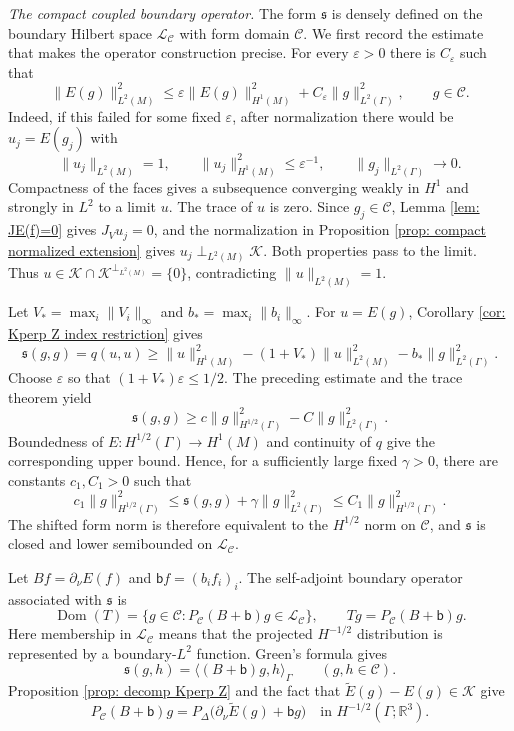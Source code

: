 \documentclass[11pt,twoside]{amsart}
\numberwithin{equation}{section}
\begin{document}
\medskip
\noindent\emph{The compact coupled boundary operator.}
The form $\mathfrak s$ is densely defined on the boundary Hilbert space $\mathscr L_\mathcal C$ with form domain $\mathcal C$. We first record the estimate that makes the operator construction precise. For every $\varepsilon>0$ there is $C_\varepsilon$ such that
\[
\|E(g)\|_{L^2(M)}^2
\le
\varepsilon\|E(g)\|_{H^1(M)}^2
+C_\varepsilon\|g\|_{L^2(\Gamma)}^2,
\qquad g\in\mathcal C.
\]
Indeed, if this failed for some fixed $\varepsilon$, after normalization there would be $u_j=E(g_j)$ with
\[
\|u_j\|_{L^2(M)}=1,
\qquad
\|u_j\|_{H^1(M)}^2\le\varepsilon^{-1},
\qquad
\|g_j\|_{L^2(\Gamma)}\to0.
\]
Compactness of the faces gives a subsequence converging weakly in $H^1$ and strongly in $L^2$ to a limit $u$. The trace of $u$ is zero. Since $g_j\in\mathcal C$, Lemma \ref{lem: JE(f)=0} gives $J_Vu_j=0$, and the normalization in Proposition \ref{prop: compact normalized extension} gives $u_j\perp_{L^2(M)}\mathcal K$. Both properties pass to the limit. Thus $u\in\mathcal K\cap\mathcal K^{\perp_{L^2(M)}}=\{0\}$, contradicting $\|u\|_{L^2(M)}=1$.

Let $V_*=\max_i\|V_i\|_\infty$ and $b_*=\max_i\|b_i\|_\infty$. For $u=E(g)$, Corollary \ref{cor: Kperp Z index restriction} gives
\[
\mathfrak s(g,g)=q(u,u)
\ge
\|u\|_{H^1(M)}^2
-(1+V_*)\|u\|_{L^2(M)}^2
-b_*\|g\|_{L^2(\Gamma)}^2.
\]
Choose $\varepsilon$ so that $(1+V_*)\varepsilon\le1/2$. The preceding estimate and the trace theorem yield
\[
\mathfrak s(g,g)
\ge
c\|g\|_{H^{1/2}(\Gamma)}^2
-C\|g\|_{L^2(\Gamma)}^2.
\]
Boundedness of $E:H^{1/2}(\Gamma)\to H^1(M)$ and continuity of $q$ give the corresponding upper bound. Hence, for a sufficiently large fixed $\gamma>0$, there are constants $c_1,C_1>0$ such that
\[
c_1\|g\|_{H^{1/2}(\Gamma)}^2
\le
\mathfrak s(g,g)+\gamma\|g\|_{L^2(\Gamma)}^2
\le
C_1\|g\|_{H^{1/2}(\Gamma)}^2.
\]
The shifted form norm is therefore equivalent to the $H^{1/2}$ norm on $\mathcal C$, and $\mathfrak s$ is closed and lower semibounded on $\mathscr L_\mathcal C$.

Let $Bf=\partial_\nu E(f)$ and $\mathsf b f=(b_if_i)_i$. The self-adjoint boundary operator associated with $\mathfrak s$ is
\[
\operatorname{Dom}(T)=\{g\in\mathcal C:P_\mathcal C(B+\mathsf b)g\in\mathscr L_\mathcal C\},
\qquad
Tg=P_\mathcal C(B+\mathsf b)g.
\]
Here membership in $\mathscr L_\mathcal C$ means that the projected $H^{-1/2}$ distribution is represented by a boundary-$L^2$ function. Green's formula gives
\[
\mathfrak s(g,h)=\langle(B+\mathsf b)g,h\rangle_\Gamma
\qquad(g,h\in\mathcal C).
\]
Proposition \ref{prop: decomp Kperp Z} and the fact that $\widetilde E(g)-E(g)\in\mathcal K$ give
\[
P_\mathcal C(B+\mathsf b)g
=P_\Delta\bigl(\partial_\nu\widetilde E(g)+\mathsf b g\bigr)
\quad\text{in }H^{-1/2}(\Gamma;\mathbb R^3).
\]
\end{document}
